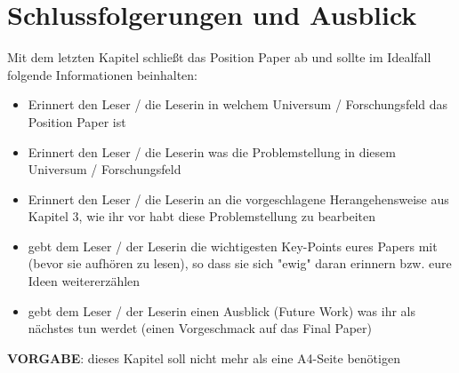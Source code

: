 
\section{Schlussfolgerungen und Ausblick}



Mit dem letzten Kapitel schließt das Position Paper ab und sollte im Idealfall folgende Informationen beinhalten:
\begin{itemize}
	\item Erinnert den Leser / die Leserin in welchem Universum / Forschungsfeld das Position Paper ist
	\item Erinnert den Leser / die Leserin was die Problemstellung in diesem Universum / Forschungsfeld
	\item Erinnert den Leser / die Leserin an die vorgeschlagene Herangehensweise aus Kapitel 3, wie ihr vor habt diese Problemstellung zu bearbeiten
	\item gebt dem Leser / der Leserin die wichtigesten Key-Points eures Papers mit (bevor sie aufhören zu lesen), so dass sie sich "ewig" daran erinnern bzw. eure Ideen weitererzählen
	\item gebt dem Leser / der Leserin einen Ausblick (Future Work) was ihr als nächstes tun werdet (einen Vorgeschmack auf das Final Paper)
\end{itemize}

\vspace{10pt}
\textbf{VORGABE}: dieses Kapitel soll nicht mehr als eine A4-Seite benötigen

